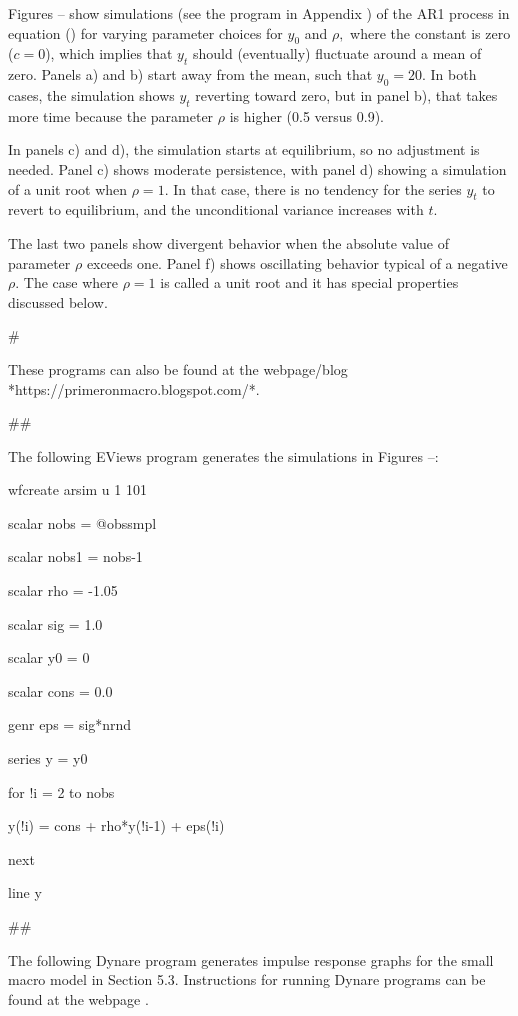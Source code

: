 ﻿\documentclass[oneside]{book}
\begin{document}
Figures -- show simulations (see the program in Appendix ) of the AR1
process in equation () for varying parameter choices for $y_{0}$
and $\rho ,$ where the constant is zero ($c=0$), which implies that $y_{t}$
should (eventually) fluctuate around a mean of zero. Panels a) and b) start away from
the mean, such that $y_{0}=20$. In both cases, the simulation shows $y_{t}$
reverting toward zero, but in panel b), that takes more time because the
parameter $\rho $ is higher (0.5 versus 0.9).

In panels c) and d), the simulation starts at equilibrium, so no adjustment is needed.  Panel c) shows moderate persistence, with panel d) showing a simulation of a unit root when $\rho=1$. In that case, there is no tendency for the series $y_{t}$ to revert to equilibrium, and the unconditional variance increases with $t$.

The last two panels show divergent behavior when the absolute value of parameter $\rho $ exceeds one. Panel f) shows oscillating behavior typical of a negative $\rho $. The case where $\rho =1$ is called a unit
root and it has special properties discussed below.



#


These programs can also be found at the webpage/blog *https://primeronmacro.blogspot.com/*.




##

The following EViews program generates the simulations in Figures --:


wfcreate arsim u 1 101

scalar nobs = @obssmpl

scalar nobs1 = nobs-1

scalar rho = -1.05

scalar sig = 1.0

scalar y0 = 0

scalar cons = 0.0

genr eps = sig*nrnd

series y = y0

for !i = 2 to nobs

y(!i) = cons + rho*y(!i-1) + eps(!i)

next

line y



##

The following Dynare program generates impulse response graphs for the small macro model in Section 5.3. Instructions for running Dynare programs can be found at the webpage .
\end{document}
